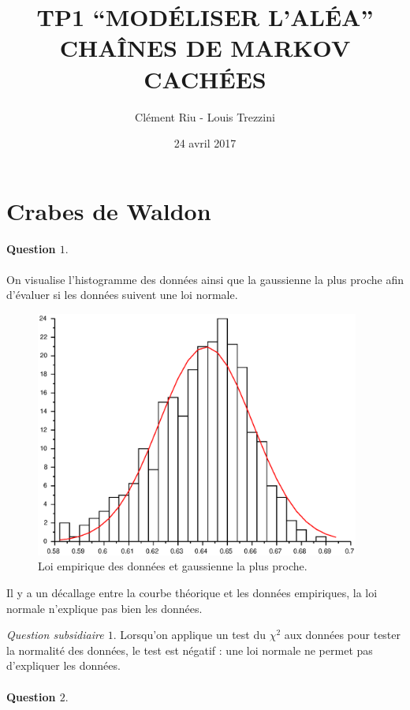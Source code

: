 \documentclass[12pt,a4paper]{article}
\title{\textbf{TP1 “MODÉLISER L’ALÉA” \\ CHAÎNES DE MARKOV CACHÉES}}
\author{Clément Riu - Louis Trezzini}
\date{24 avril 2017}
\begin{document}
\maketitle

\setcounter{section}{1}
\section{Crabes de Waldon}

\paragraph*{Question $1.$} On visualise l'histogramme des données ainsi que la gaussienne la plus proche afin d'évaluer si les données suivent une loi normale.

\begin{figure}[H]
	\centering
	\includegraphics[width=0.95\textwidth]{images/figure1.eps}
	\caption{Loi empirique des données et gaussienne la plus proche.}
\end{figure}

Il y a un décallage entre la courbe théorique et les données empiriques, la loi normale n'explique pas bien les données.

\textit{Question subsidiaire $1.$} Lorsqu'on applique un test du $\chi^2$ aux données pour tester la normalité des données, le test est négatif : une loi normale ne permet pas d'expliquer les données.

\paragraph*{Question $2.$}
\end{document}
